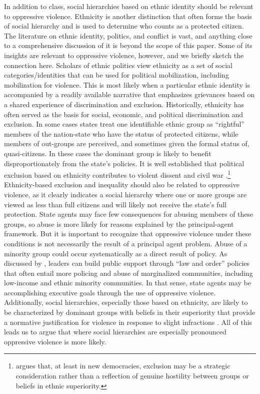 \documentclass[11pt]{article}
\begin{document}
In addition to class, social hierarchies based on ethnic identity should be relevant to oppressive violence. Ethnicity is another distinction that often forms the basis of social hierarchy and is used to determine who counts as a protected citizen. The literature on ethnic identity, politics, and conflict is vast, and anything close to a comprehensive discussion of it is beyond the scope of this paper. Some of its insights are relevant to oppressive violence, however, and we briefly sketch the connection here. Scholars of ethnic politics view ethnicity as a set of social categories/identities that can be used for political mobilization, including mobilization for violence. This is most likely when a particular ethnic identity is accompanied by a readily available narrative that emphasizes grievances based on a shared experience of discrimination and exclusion. Historically, ethnicity has often served as the basis for social, economic, and political discrimination and exclusion. In some cases states treat one identifiable ethnic group as ``rightful'' members of the nation-state who have the status of protected citizens, while members of out-groups are perceived, and sometimes given the formal status of, quasi-citizens. In these cases the dominant group is likely to benefit disproportionately from the state's policies. It is well established that political exclusion based on ethnicity contributes to violent dissent and civil war \citep{birnir2006ethnicity,cederman2013inequality}.\footnote{ \citet{birnir2006ethnicity} argues that, at least in new democracies, exclusion may be a strategic consideration rather than a reflection of genuine hostility between groups or beliefs in ethnic superiority.} Ethnicity-based exclusion and inequality should also be related to oppressive violence, as it clearly indicates a social hierarchy where one or more groups are viewed as less than full citizens and will likely not receive the state's full protection. State agents may face few consequences for abusing members of these groups, so abuse is more likely for reasons explained by the principal-agent framework. But it is important to recognize that oppressive violence under these conditions is not necessarily the result of a principal agent problem. Abuse of a minority group could occur systematically as a direct result of policy. As discussed by \citet{Rejali2007}, leaders can build public support through ``law and order'' policies that often entail more policing and abuse of marginalized  communities, including low-income and ethnic minority communities. In that sense, state agents may be accomplishing executive goals through the use of oppressive violence. Additionally, social hierarchies, especially those based on ethnicity, are likely to be characterized by dominant groups with beliefs in their superiority that provide a normative justification for violence in response to slight infractions \citep{sidanius2001social}. All of this leads us to argue that where social hierarchies are especially pronounced oppressive violence is more likely. 
\end{document}
